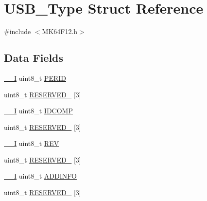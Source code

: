 \hypertarget{struct_u_s_b___type}{}\section{U\+S\+B\+\_\+\+Type Struct Reference}
\label{struct_u_s_b___type}


{\ttfamily \#include $<$M\+K64\+F12.\+h$>$}

\subsection*{Data Fields}
\begin{DoxyCompactItemize}
\item 
\mbox{\hyperlink{core__cm4_8h_af63697ed9952cc71e1225efe205f6cd3}{\+\_\+\+\_\+I}} uint8\+\_\+t \mbox{\hyperlink{group___v_r_e_f___peripheral___access___layer_ga077edc39b83ba91d23059f34a17d48fb}{P\+E\+R\+ID}}
\item 
uint8\+\_\+t \mbox{\hyperlink{group___v_r_e_f___peripheral___access___layer_ga6d02c9345b2d39c945c905d46077a0ec}{R\+E\+S\+E\+R\+V\+E\+D\+\_}} \mbox{[}3\mbox{]}
\item 
\mbox{\hyperlink{core__cm4_8h_af63697ed9952cc71e1225efe205f6cd3}{\+\_\+\+\_\+I}} uint8\+\_\+t \mbox{\hyperlink{group___v_r_e_f___peripheral___access___layer_gaa175a27eddae37d758847685effe7ab0}{I\+D\+C\+O\+MP}}
\item 
uint8\+\_\+t \mbox{\hyperlink{group___v_r_e_f___peripheral___access___layer_ga8920d7bfe319ce3f5af958ad4c8f2cca}{R\+E\+S\+E\+R\+V\+E\+D\+\_}} \mbox{[}3\mbox{]}
\item 
\mbox{\hyperlink{core__cm4_8h_af63697ed9952cc71e1225efe205f6cd3}{\+\_\+\+\_\+I}} uint8\+\_\+t \mbox{\hyperlink{group___v_r_e_f___peripheral___access___layer_ga9131f08aa5a24b8c9ef95d51f62810de}{R\+EV}}
\item 
uint8\+\_\+t \mbox{\hyperlink{group___v_r_e_f___peripheral___access___layer_ga76a9ec2331c09e8e213dfb169fbac870}{R\+E\+S\+E\+R\+V\+E\+D\+\_}} \mbox{[}3\mbox{]}
\item 
\mbox{\hyperlink{core__cm4_8h_af63697ed9952cc71e1225efe205f6cd3}{\+\_\+\+\_\+I}} uint8\+\_\+t \mbox{\hyperlink{group___v_r_e_f___peripheral___access___layer_ga3b414f3639d8e9ccdeccf5ec15029b9c}{A\+D\+D\+I\+N\+FO}}
\item 
uint8\+\_\+t \mbox{\hyperlink{group___v_r_e_f___peripheral___access___layer_ga2a68f89086ca788e9123a2281decfe22}{R\+E\+S\+E\+R\+V\+E\+D\+\_}} \mbox{[}3\mbox{]}
\item 

\end{DoxyCompactItemize}
